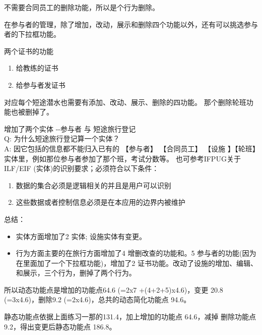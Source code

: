 不需要合同员工的删除功能，所以是个行为删除。

在参与者的管理，除了增加，改动，展示和删除四个功能以外，还有可以挑选参与者的下拉框功能。

两个证书的功能

\begin{enumerate}
\tightlist
\item
  给教练的证书
\item
  给参与者发证书
\end{enumerate}

对应每个短途潜水也需要有添加、改动、展示、删除的四功能。
那个删除轮班功能也被删掉了。

增加了两个实体 -\/-参与者 与 短途旅行登记\\
Q: 为什么短途旅行登记算一个实体？\\
A: 因它包括的信息都不能归入已有的 【参与者】 【合同员工】 【设施
】【轮班】实体里，例如那位参与者参加了那个班，考试分数等。
也可参考IFPUG关于ILF/EIF (实体)的识别要求；必须符合以下条件：

\begin{enumerate}
\tightlist
\item
  数据的集合必须是逻辑相关的并且是用户可以识别
\item
  这些数据或者控制信息必须是在本应用的边界内被维护
\end{enumerate}

总结：

\begin{itemize}
\tightlist
\item
  实体方面增加了2 实体; 设施实体有变更。
\item
  行为方面主要的在旅行方面增加了4 增删改查的功能和。5
  参与者的功能(因为在里面加了一个下拉框功能)，增加了2
  证书功能。改动了设施的增加、编辑、和展示，三个行为，删掉了两个行为。
\end{itemize}

所以动态功能点是增加的功能点64.6 (=2x7 +(4+2+5)x4.6)，变更 20.8
(=3x4.6)，删除9.2 (=2x4.6)，总共的动态简化功能点 94.6。

静态功能点依据上面练习一那的131.4，加上增加的功能点 64.6，减掉
删除功能点 9.2，得出变更后静态功能点 186.8。


